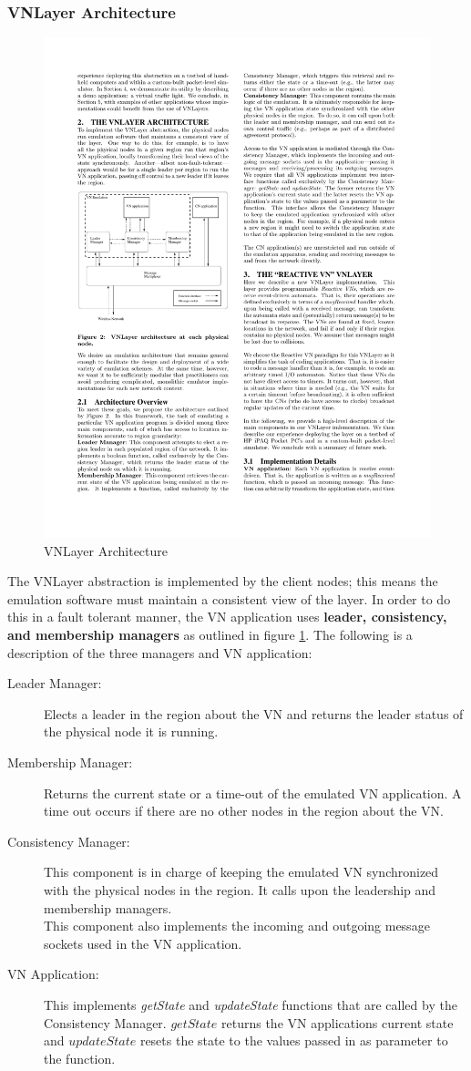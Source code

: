 \documentclass[12pt]{article}
\begin{document}
\subsubsection{VNLayer Architecture}
\begin{figure}
\includegraphics[width=.65\textwidth]{vnlayerarchitecture.pdf} 
\caption{VNLayer Architecture \cite{vnlayer}}
\label{fig:vnlayerArch}
\end{figure}
The VNLayer abstraction is implemented by the client nodes; this means the emulation software must maintain a consistent view of the layer.  In order to do this in a fault tolerant manner, the VN application uses  {\bf leader, consistency, and membership managers} as outlined in figure \ref{fig:vnlayerArch}.  The following is a description of the three managers and VN application:
\begin{description}
\item[Leader Manager:] Elects a leader in the region about the VN and returns  the leader status of the physical node it is running.
\item[Membership Manager:] Returns the current state or a time-out of the emulated VN application.  A time out occurs if there are no other nodes in the region about the VN.
\item[Consistency Manager:] This component is in charge of keeping the emulated VN synchronized with the physical nodes in the region. It calls upon the leadership and membership managers.\\
This component also implements the incoming and outgoing message sockets used in the VN application. 

\item[VN Application:] This implements {\em getState} and {\em updateState} functions that are called by the Consistency Manager.  $getState$ returns the VN applications current state and $updateState$ resets the state to the values passed in as parameter to the function.  
\end{description}
\end{document}
